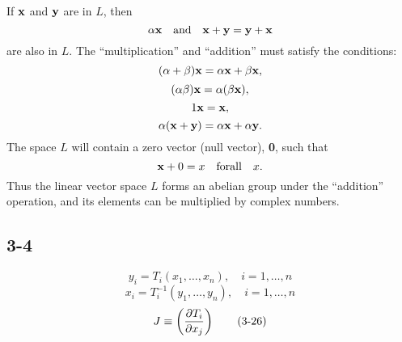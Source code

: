 \documentclass{article}
\begin{document}
If $\mathbf x$ and $\mathbf y$ are in $L$, then
$$
\alpha{\mathbf x} \quad {\rm and} \quad {\mathbf x+\mathbf y= \mathbf y+\mathbf x}
$$
are also in $L$. The ``multiplication'' and ``addition'' must satisfy the conditions:
$$(\alpha + \beta)\mathbf x = \alpha\mathbf x + \beta\mathbf x,$$
$$(\alpha\beta)\mathbf x = \alpha(\beta\mathbf x),$$
$$1\mathbf x = \mathbf x,$$
$$\alpha(\mathbf x+\mathbf y) = \alpha\mathbf x + \alpha\mathbf y.$$
The space $L$ will contain a zero vector (null vector), {\bf 0}, such that
$$\mathbf x + 0 = x \quad {\rm for all} \quad x.$$
Thus the linear vector space $L$ forms an abelian group under the ``addition'' operation, and its elements can be multiplied by complex numbers.

\subsection{3-4}

\begin{equation}
y_i = T_i(x_1,\dots,x_n), \quad i=1,\dots,n\tag{3-25}
\end{equation}
\begin{equation}
x_i = T^{-1}_i(y_1,\dots,y_n), \quad i=1,\dots,n\tag{3-25a}
\end{equation}
\begin{equation}
J \equiv \left( \partial T_i\over\partial x_j \right) \tag{3-26}
\end{equation}
\end{document}
